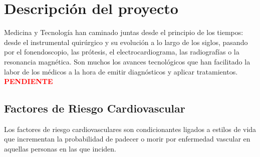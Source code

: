 \chapter {Descripción del proyecto}
\label{cap:descripción del proyecto}

Medicina y Tecnología han caminado juntas desde el principio de los tiempos: desde el instrumental quirúrgico y su evolución a lo largo de los siglos, pasando por el fonendoscopio, las prótesis, el electrocardiograma, las radiografías o la resonancia magnética. Son muchos los avances tecnológicos que han facilitado la labor de los médicos a la hora de emitir diagnósticos y aplicar tratamientos.
\textbf{\textcolor{red}{\huge PENDIENTE}}

\section{Factores de Riesgo Cardiovascular}
Los factores de riesgo cardiovasculares son condicionantes ligados a estilos de vida que incrementan la probabilidad de padecer o morir por enfermedad vascular en aquellas personas en las que inciden.
